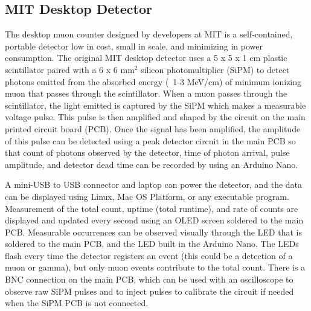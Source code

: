 \subsection{MIT Desktop Detector}
The desktop muon counter designed by developers at MIT is a self-contained, portable detector low in cost, small in scale, and minimizing in power consumption. 
The original MIT desktop detector uses a 5 x 5 x 1 cm plastic scintillator paired with a 6 x 6 mm$^2$ silicon photomultiplier (SiPM) to detect photons emitted from the absorbed energy (~1-3 MeV/cm) of minimum ionizing muon that passes through the scintillator. 
When a muon passes through the scintillator, the light emitted is captured by the SiPM which makes a measurable voltage pulse. This pulse is then amplified and shaped by the circuit on the main printed circuit board (PCB). Once the signal has been amplified, the amplitude of this pulse can be detected using a peak detector circuit in the main PCB so that count of photons observed by the detector, time of photon arrival, pulse amplitude, and detector dead time can be recorded by using an Arduino Nano.

 A mini-USB to USB connector and laptop can power the detector, and the data can be displayed using Linux, Mac OS Platform, or any executable program. Measurement of the total count, uptime (total runtime), and rate of counts are displayed and updated every second using an OLED screen soldered to the main PCB. Measurable occurrences can be observed visually through the LED that is soldered to the main PCB, and the LED built in the Arduino Nano. The LEDs flash every time the detector registers an event (this could be a detection of a muon or gamma), but only muon events contribute to the total count. There is a BNC connection on the main PCB, which can be used with an oscilloscope to observe raw SiPM pulses and to inject pulses to calibrate the circuit if needed when the SiPM PCB is not connected. 


